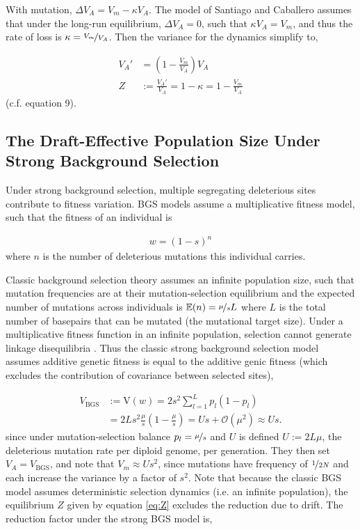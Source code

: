 \documentclass[11pt]{article}
\newcommand{\E}{\mathbb{E}}
\newcommand{\V}{\text{V}}
\begin{document}
With mutation, $\Delta V_A = V_m - \kappa V_A$. The model of Santiago and
Caballero assumes that under the long-run equilibrium, $\Delta V_A = 0$, such
that $\kappa V_A = V_m$, and thus the rate of loss is $\kappa =
\nicefrac{V_m}{V_A}$. Then the variance for the dynamics simplify to,

\begin{align}
  \label{eq:Z}
  V_A' &= \left(1 - \frac{V_m}{V_A}\right) V_A \nonumber \\
  Z &:= \frac{V_A'}{V_A} = 1 - \kappa = 1 - \frac{V_m}{V_A} 
\end{align}
%
(c.f. \cite{Santiago1998-bs} equation 9). 


\subsection{The Draft-Effective Population Size Under Strong Background Selection}

Under strong background selection, multiple segregating deleterious sites
contribute to fitness variation. BGS models assume a multiplicative fitness
model, such that the fitness of an individual is

\begin{align}
  w = (1-s)^{n}
\end{align}
%
where $n$ is the number of deleterious mutations this individual carries.

Classic background selection theory assumes an infinite population size, such
that mutation frequencies are at their mutation-selection equilibrium and the
expected number of mutations across individuals is $\E(n) = \nicefrac{\mu}{s}L$
where $L$ is the total number of basepairs that can be mutated (the mutational
target size).  Under a multiplicative fitness function in an infinite
population, selection cannot generate linkage disequilibria
\parencite{Turelli1990-kd}. Thus the classic strong background selection model
assumes additive genetic fitness is equal to the additive genic fitness (which
excludes the contribution of covariance between selected sites), 

\begin{align}
  \label{eq:va_bgs}
  V_\text{BGS} &:= \V(w) = 2 s^2 \sum_{l=1}^L p_l(1-p_l) \nonumber  \\
            &= 2 L s^2 \frac{\mu}{s} \left( 1 - \frac{\mu}{s}\right) = U s + \mathcal{O}(\mu^2) \approx Us.
\end{align}
%
since under mutation-selection balance $p_l = \nicefrac{\mu}{s}$ and $U$ is
defined $U := 2 L \mu$, the deleterious mutation rate per diploid genome, per
generation. They then set $V_A = V_\text{BGS}$, and note that $V_m \approx
Us^2$, since mutations have frequency of $\nicefrac{1}{2N}$ and each increase
the variance by a factor of $s^2$. Note that because the classic BGS model
assumes deterministic selection dynamics (i.e. an infinite population), the
equilibrium $Z$ given by equation \eqref{eq:Z} excludes the reduction due to
drift. The reduction factor under the strong BGS model is,
\end{document}
